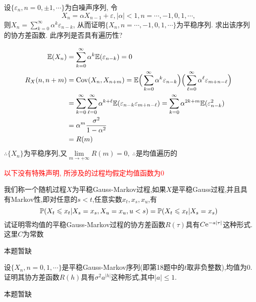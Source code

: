 \begin{problem}{4.17}
设$\{\varepsilon_n, n=0,\pm1,\cdots\}$为白噪声序列, 令
\[X_n = \alpha X_{n-1} + \varepsilon, |\alpha| < 1, n = \cdots, -1, 0, 1, \cdots,\]
则$X_n = \sum\limits^\infty_{k=0}\alpha^k\varepsilon_{n-k}$, 从而证明$\{X_n, n = \cdots, -1, 0, 1, \cdots\}$为平稳序列. 求出该序列的协方差函数. 此序列是否具有遍历性?
\end{problem}
\begin{solution}
	\[
		\begin{split}
			\mathbb{E}(X_n) & = \sum^{\infty}_{k=0}\alpha^k\mathbb{E}(\varepsilon_{n-k})= 0\\
			R_X(n, n+m) & = \mathrm{Cov}(X_n, X_{n+m}) = \mathbb{E}\Big(\sum^{\infty}_{k=0}\alpha^k \varepsilon_{n-k}\Big)\Big(\sum^{\infty}_{\ell=0}\alpha^\ell\varepsilon_{m+n-\ell}\Big)\\
			& = \sum^{\infty}_{k=0}\sum^{\infty}_{\ell=0}\alpha^{k+\ell}\mathbb{E}(\varepsilon_{n-k}\varepsilon_{m+n-\ell}) = \sum^{\infty}_{k=0}\alpha^{2k+m}\mathbb{E}(\varepsilon^2_{n-k})\\
			& = \alpha^m\frac{\sigma^2}{1-\alpha^2}\\
			& = R(m)
		\end{split}
	\]
	$\therefore \{X_n\}$为平稳序列,又$\lim\limits_{m\to +\infty}R(m) = 0,~\therefore$是均值遍历的\\
\end{solution}

\noindent\textcolor{red}{以下没有特殊声明, 所涉及的过程均假定均值函数为$0$}

\begin{problem}{4.18}
我们称一个随机过程$X$为平稳Gauss-Markov过程,如果$X$是平稳Gauss过程,并且具有Markov性,即对任意的$s<t$,任意实数$x_t,x_s,x_u$,有
\[\mathbb{P}(X_t\leqslant x_t|X_s=x_s, X_u=x_u, u<s)=\mathbb{P}(X_t\leqslant x_t|X_s=x_s)\]
试证明零均值的平稳Gauss-Markov过程的协方差函数$R(\tau )$具有$C\mathrm{e}^{-a|\tau|}$这种形式.这里$C$为常数
\end{problem}
\begin{solution}
	本题暂缺
\end{solution}

\begin{problem}{4.19}
设$\{X_n,n=0,1,\cdots \}$是平稳Gauss-Markov序列(即第18题中的$t$取非负整数),均值为0.证明其协方差函数$R(h)$具有$\sigma ^2a^{|h|}$这种形式,其中$|a|\leqslant 1$.
\end{problem}
\begin{solution}
	本题暂缺
\end{solution}


